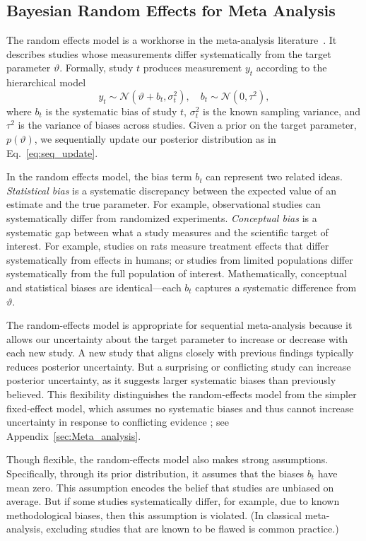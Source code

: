 \subsection{Bayesian Random Effects for Meta Analysis}
\label{sec:random-effects-model}

The random effects model is a workhorse in the meta-analysis literature~\citep{dersimonian1986meta,Higgins_Thompson_Spiegelhalter_2009,Spence_Steinsaltz_Fanshawe_2016}. It describes studies whose measurements differ systematically from the target parameter $\vartheta$. Formally, study $t$ produces measurement $y_t$ according to the hierarchical model
\[
  y_t \sim \mathcal{N}(\vartheta + b_t, \sigma_t^2), \quad b_t \sim \mathcal{N}(0, \tau^2),
\]
where $b_t$ is the systematic bias of study $t$, $\sigma_t^2$ is the known sampling variance, and $\tau^2$ is the variance of biases across studies. Given a prior on the target parameter, $p(\vartheta)$, we sequentially update our posterior distribution as in Eq.~\ref{eq:seq_update}.

In the random effects model, the bias term $b_t$ can represent two related ideas. \textit{Statistical bias} is a systematic discrepancy between the expected value of an estimate and the true parameter. For example, observational studies can systematically differ from randomized experiments. \textit{Conceptual bias} is a systematic gap between what a study measures and the scientific target of interest. For example, studies on rats measure treatment effects that differ systematically from effects in humans; or studies from limited populations differ systematically from the full population of interest. Mathematically, conceptual and statistical biases are identical---each $b_t$ captures a systematic difference from $\vartheta$.

The random-effects model is appropriate for sequential meta-analysis because it allows our uncertainty about the target parameter to increase or decrease with each new study. A new study that aligns closely with previous findings typically reduces posterior uncertainty. But a surprising or conflicting study can increase posterior uncertainty, as it suggests larger systematic biases than previously believed. This flexibility distinguishes the random-effects model from the simpler fixed-effect model, which assumes no systematic biases and thus cannot increase uncertainty in response to conflicting evidence \citep{Cooper_2009}; see Appendix~\ref{sec:Meta_analysis}.


Though flexible, the random-effects model also makes strong assumptions. Specifically, through its prior distribution, it assumes that the biases
$b_t$ have mean zero. This assumption encodes the belief that studies are unbiased on average. But if some studies systematically differ, for example, due to known methodological biases, then this assumption is violated. (In classical meta-analysis, excluding studies that are known to be flawed is common practice.)

